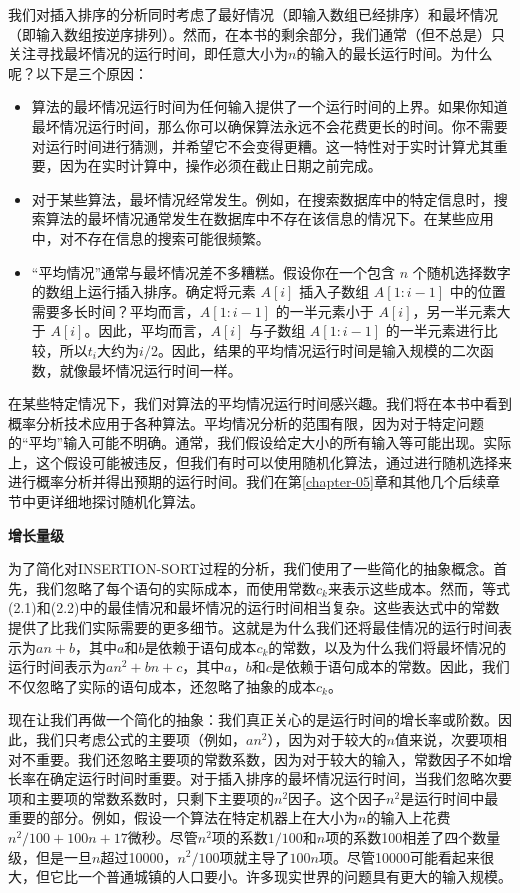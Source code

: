 \documentclass[lang=cn,newtx,10pt,scheme=chinese]{elegantbook}
\begin{document}
我们对插入排序的分析同时考虑了最好情况（即输入数组已经排序）和最坏情况（即输入数组按逆序排列）。然而，在本书的剩余部分，我们通常（但不总是）只关注寻找最坏情况的运行时间，即任意大小为$n$的输入的最长运行时间。为什么呢？以下是三个原因：

\begin{itemize}
    \item 算法的最坏情况运行时间为任何输入提供了一个运行时间的上界。如果你知道最坏情况运行时间，那么你可以确保算法永远不会花费更长的时间。你不需要对运行时间进行猜测，并希望它不会变得更糟。这一特性对于实时计算尤其重要，因为在实时计算中，操作必须在截止日期之前完成。
    \item 对于某些算法，最坏情况经常发生。例如，在搜索数据库中的特定信息时，搜索算法的最坏情况通常发生在数据库中不存在该信息的情况下。在某些应用中，对不存在信息的搜索可能很频繁。
    \item ``平均情况''通常与最坏情况差不多糟糕。假设你在一个包含 $n$ 个随机选择数字的数组上运行插入排序。确定将元素 $A[i]$ 插入子数组 $A[1:i-1]$ 中的位置需要多长时间？平均而言，$A[1:i-1]$ 的一半元素小于 $A[i]$，另一半元素大于 $A[i]$。因此，平均而言，$A[i]$ 与子数组 $A[1:i-1]$ 的一半元素进行比较，所以$t_i$大约为$i/2$。因此，结果的平均情况运行时间是输入规模的二次函数，就像最坏情况运行时间一样。
\end{itemize}

在某些特定情况下，我们对算法的平均情况运行时间感兴趣。我们将在本书中看到概率分析技术应用于各种算法。平均情况分析的范围有限，因为对于特定问题的``平均''输入可能不明确。通常，我们假设给定大小的所有输入等可能出现。实际上，这个假设可能被违反，但我们有时可以使用随机化算法，通过进行随机选择来进行概率分析并得出预期的运行时间。我们在第\ref{chapter-05}章和其他几个后续章节中更详细地探讨随机化算法。

\textbf{增长量级}

为了简化对INSERTION-SORT过程的分析，我们使用了一些简化的抽象概念。首先，我们忽略了每个语句的实际成本，而使用常数$c_k$来表示这些成本。然而，等式(2.1)和(2.2)中的最佳情况和最坏情况的运行时间相当复杂。这些表达式中的常数提供了比我们实际需要的更多细节。这就是为什么我们还将最佳情况的运行时间表示为$an+b$，其中$a$和$b$是依赖于语句成本$c_k$的常数，以及为什么我们将最坏情况的运行时间表示为$an^2+bn+c$，其中$a$，$b$和$c$是依赖于语句成本的常数。因此，我们不仅忽略了实际的语句成本，还忽略了抽象的成本$c_k$。

现在让我们再做一个简化的抽象：我们真正关心的是运行时间的增长率或阶数。因此，我们只考虑公式的主要项（例如，$an^2$），因为对于较大的$n$值来说，次要项相对不重要。我们还忽略主要项的常数系数，因为对于较大的输入，常数因子不如增长率在确定运行时间时重要。对于插入排序的最坏情况运行时间，当我们忽略次要项和主要项的常数系数时，只剩下主要项的$n^2$因子。这个因子$n^2$是运行时间中最重要的部分。例如，假设一个算法在特定机器上在大小为$n$的输入上花费$n^2/100 + 100n + 17$微秒。尽管$n^2$项的系数$1/100$和$n$项的系数100相差了四个数量级，但是一旦$n$超过10000，$n^2/100$项就主导了$100n$项。尽管10000可能看起来很大，但它比一个普通城镇的人口要小。许多现实世界的问题具有更大的输入规模。
\end{document}
